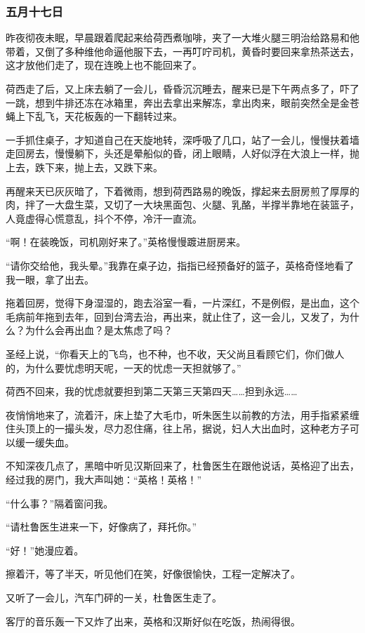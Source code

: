 \subsubsection{五月十七日}
\par 昨夜彻夜未眠，早晨跟着爬起来给荷西煮咖啡，夹了一大堆火腿三明治给路易和他带着，又倒了多种维他命逼他服下去，一再叮咛司机，黄昏时要回来拿热茶送去，这才放他们走了，现在连晚上也不能回来了。
\par 荷西走了后，又上床去躺了一会儿，昏昏沉沉睡去，醒来已是下午两点多了，吓了一跳，想到牛排还冻在冰箱里，奔出去拿出来解冻，拿出肉来，眼前突然全是金苍蝇上下乱飞，天花板轰的一下翻转过来。
\par 一手抓住桌子，才知道自己在天旋地转，深呼吸了几口，站了一会儿，慢慢扶着墙走回房去，慢慢躺下，头还是晕船似的昏，闭上眼睛，人好似浮在大浪上一样，抛上去，跌下来，抛上去，又跌下来。
\par 再醒来天已灰灰暗了，下着微雨，想到荷西路易的晚饭，撑起来去厨房煎了厚厚的肉，拌了一大盘生菜，又切了一大块黑面包、火腿、乳酪，半撑半靠地在装篮子，人竟虚得心慌意乱，抖个不停，冷汗一直流。
\par “啊！在装晚饭，司机刚好来了。”英格慢慢踱进厨房来。
\par “请你交给他，我头晕。”我靠在桌子边，指指已经预备好的篮子，英格奇怪地看了我一眼，拿了出去。
\par 拖着回房，觉得下身湿湿的，跑去浴室一看，一片深红，不是例假，是出血，这个毛病前年拖到去年，回到台湾去治，再出来，就止住了，这一会儿，又发了，为什么？为什么会再出血？是太焦虑了吗？
\par 圣经上说，“你看天上的飞鸟，也不种，也不收，天父尚且看顾它们，你们做人的，为什么要忧虑明天呢，一天的忧虑一天担就够了。”
\par 荷西不回来，我的忧虑就要担到第二天第三天第四天……担到永远……
\par 夜悄悄地来了，流着汗，床上垫了大毛巾，听朱医生以前教的方法，用手指紧紧缠住头顶上的一撮头发，尽力忍住痛，往上吊，据说，妇人大出血时，这种老方子可以缓一缓失血。
\par 不知深夜几点了，黑暗中听见汉斯回来了，杜鲁医生在跟他说话，英格迎了出去，经过我的房门，我大声叫她：“英格！英格！”
\par “什么事？”隔着窗问我。
\par “请杜鲁医生进来一下，好像病了，拜托你。”
\par “好！”她漫应着。
\par 擦着汗，等了半天，听见他们在笑，好像很愉快，工程一定解决了。
\par 又听了一会儿，汽车门砰的一关，杜鲁医生走了。
\par 客厅的音乐轰一下又炸了出来，英格和汉斯好似在吃饭，热闹得很。
